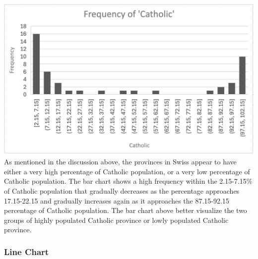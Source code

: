 \documentclass[
  letterpaper,
  DIV=11,
  numbers=noendperiod]{scrreprt}
\begin{document}
\includegraphics{./Excel_1_Unit/Week1_Janice/Week 1/Week 1 Wednesday/Swiss_barchart.png}
As mentioned in the discussion above, the provinces in Swiss appear to
have either a very high percentage of Catholic population, or a very low
percentage of Catholic population. The bar chart shows a high frequency
within the 2.15-7.15\% of Catholic population that gradually decreases
as the percentage approaches 17.15-22.15 and gradually increases again
as it approaches the 87.15-92.15 percentage of Catholic population. The
bar chart above better visualize the two groups of highly populated
Catholic province or lowly populated Catholic province.

\subsubsection{Line Chart}\label{line-chart}
\end{document}
